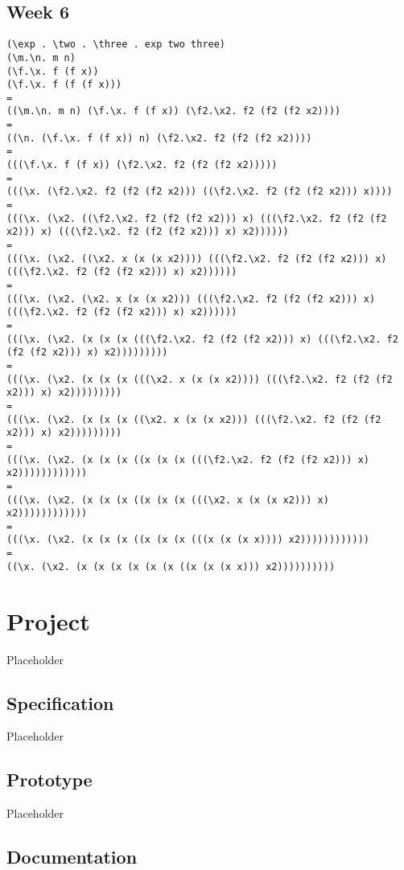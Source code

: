 \documentclass{article}
\theoremstyle{theorem}
\theoremstyle{definition}
\theoremstyle{remark}
\begin{document}
\subsection{Week 6}
\begin{lstlisting}
(\exp . \two . \three . exp two three)
(\m.\n. m n)
(\f.\x. f (f x))
(\f.\x. f (f (f x)))
=
((\m.\n. m n) (\f.\x. f (f x)) (\f2.\x2. f2 (f2 (f2 x2))))
=
((\n. (\f.\x. f (f x)) n) (\f2.\x2. f2 (f2 (f2 x2))))
=
(((\f.\x. f (f x)) (\f2.\x2. f2 (f2 (f2 x2)))))
=
(((\x. (\f2.\x2. f2 (f2 (f2 x2))) ((\f2.\x2. f2 (f2 (f2 x2))) x))))
=
(((\x. (\x2. ((\f2.\x2. f2 (f2 (f2 x2))) x) (((\f2.\x2. f2 (f2 (f2 x2))) x) (((\f2.\x2. f2 (f2 (f2 x2))) x) x2))))))
=
(((\x. (\x2. ((\x2. x (x (x x2)))) (((\f2.\x2. f2 (f2 (f2 x2))) x) (((\f2.\x2. f2 (f2 (f2 x2))) x) x2))))))
=
(((\x. (\x2. (\x2. x (x (x x2))) (((\f2.\x2. f2 (f2 (f2 x2))) x) (((\f2.\x2. f2 (f2 (f2 x2))) x) x2))))))
=
(((\x. (\x2. (x (x (x (((\f2.\x2. f2 (f2 (f2 x2))) x) (((\f2.\x2. f2 (f2 (f2 x2))) x) x2)))))))))
=
(((\x. (\x2. (x (x (x (((\x2. x (x (x x2)))) (((\f2.\x2. f2 (f2 (f2 x2))) x) x2)))))))))
=
(((\x. (\x2. (x (x (x ((\x2. x (x (x x2))) (((\f2.\x2. f2 (f2 (f2 x2))) x) x2)))))))))
=
(((\x. (\x2. (x (x (x ((x (x (x (((\f2.\x2. f2 (f2 (f2 x2))) x) x2))))))))))))
=
(((\x. (\x2. (x (x (x ((x (x (x (((\x2. x (x (x x2))) x) x2))))))))))))
=
(((\x. (\x2. (x (x (x ((x (x (x (((x (x (x x)))) x2))))))))))))
=
((\x. (\x2. (x (x (x (x (x (x ((x (x (x x))) x2))))))))))
\end{lstlisting}

\section{Project}

Placeholder

\subsection{Specification}

Placeholder

\subsection{Prototype}

Placeholder

\subsection{Documentation}
\end{document}
